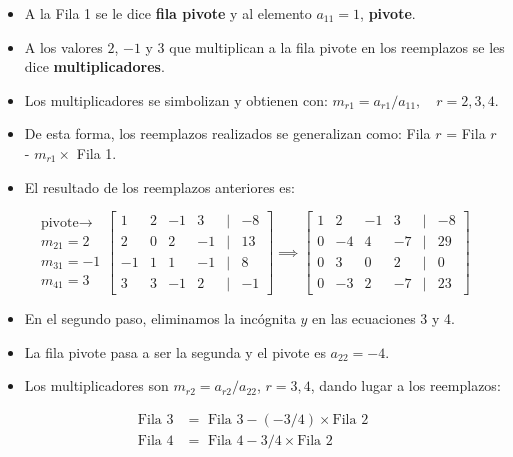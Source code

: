\documentclass[]{book}
\providecommand{\tightlist}{%
  \setlength{\itemsep}{0pt}\setlength{\parskip}{0pt}}
\begin{document}
\begin{itemize}
\tightlist
\item
  A la Fila 1 se le dice \textbf{fila pivote} y al elemento \(a_{11}=1\), \textbf{pivote}.
\item
  A los valores \(2\), \(-1\) y \(3\) que multiplican a la fila pivote en los reemplazos se les dice \textbf{multiplicadores}.
\item
  Los multiplicadores se simbolizan y obtienen con: \(m_{r1} = a_{r1} / a_{11}, \quad r = 2, 3, 4\).
\item
  De esta forma, los reemplazos realizados se generalizan como: Fila \(r\) = Fila \(r\) - \(m_{r1}\times\) Fila 1.
\item
  El resultado de los reemplazos anteriores es:
\end{itemize}

\[
\begin{matrix}
\text{pivote} \rightarrow \\ m_{21} = 2 \\ m_{31} = -1 \\ m_{41} = 3
\end{matrix}
\begin{bmatrix}
1 & 2 & -1 & 3 &|& -8\\
2 & 0 & 2 & -1 &|& 13\\
-1 & 1 & 1 & -1 &|& 8\\
3 & 3 & -1 & 2 &|& -1  
\end{bmatrix}
\implies
\begin{bmatrix}
1 & 2 & -1 & 3 &|& -8\\
0 & -4 & 4 & -7 &|& 29\\
0 & 3 & 0 & 2 &|& 0\\
0 & -3 & 2 & -7 &|& 23  
\end{bmatrix}
\]

\begin{itemize}
\tightlist
\item
  En el segundo paso, eliminamos la incógnita \(y\) en las ecuaciones 3 y 4.
\item
  La fila pivote pasa a ser la segunda y el pivote es \(a_{22}=-4\).
\item
  Los multiplicadores son \(m_{r2}=a_{r2}/a_{22}\), \(r=3,4\), dando lugar a los reemplazos:
\end{itemize}

\[
\begin{array}{cl}
\text{Fila 3} &= \text{ Fila 3} - (-3/4) \times \text{Fila 2} \\
\text{Fila 4} &= \text{ Fila 4} - 3/4 \times \text{Fila 2} 
\end{array}
\]
\end{document}
